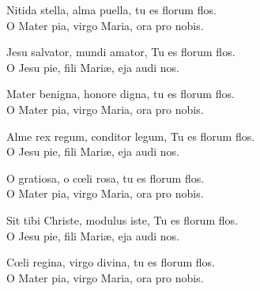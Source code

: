 
\strofa Nitida stella, alma puella, tu es florum flos.\\
O Mater pia, virgo Maria, ora pro nobis.

\spazio

\strofa Jesu salvator, mundi amator, Tu es florum flos.\\
O Jesu pie, fili Mari\ae, eja audi nos.

\spazio

\strofa Mater benigna, honore digna, tu es florum flos.\\
O Mater pia, virgo Maria, ora pro nobis.

\spazio

\strofa Alme rex regum, conditor legum, Tu es florum flos.\\
O Jesu pie, fili Mari\ae, eja audi nos.

\spazio

\strofa O gratiosa, o c\oe li rosa, tu es florum flos.\\
O Mater pia, virgo Maria, ora pro nobis.

\spazio

\strofa Sit tibi Christe, modulus iste, Tu es florum flos.\\
O Jesu pie, fili Mari\ae, eja audi nos.

\spazio

\strofa C\oe li regina, virgo divina, tu es florum flos.\\
O Mater pia, virgo Maria, ora pro nobis.
